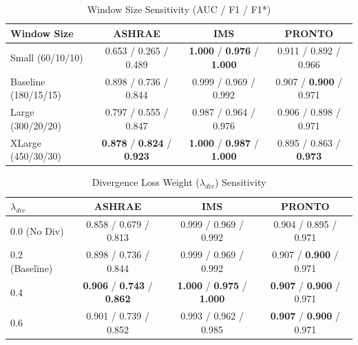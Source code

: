 
\begin{table}[t]
\centering
\scriptsize
\caption{Window Size Sensitivity (AUC / F1 / F1*)}
\label{tab:window_sensitivity}
\begin{tabular}{l|ccc}
\toprule
\textbf{Window Size} & \textbf{ASHRAE} & \textbf{IMS} & \textbf{PRONTO} \\
\midrule
Small (60/10/10) & 0.653 / 0.265 / 0.489 & \textbf{1.000} / \textbf{0.976} / \textbf{1.000} & 0.911 / 0.892 / 0.966 \\
Baseline (180/15/15) & 0.898 / 0.736 / 0.844 & 0.999 / 0.969 / 0.992 & 0.907 / \textbf{0.900} / 0.971 \\
Large (300/20/20) & 0.797 / 0.555 / 0.847 & 0.987 / 0.964 / 0.976 & 0.906 / 0.898 / 0.971 \\
XLarge (450/30/30) & \textbf{0.878} / \textbf{0.824} / \textbf{0.923} & \textbf{1.000} / \textbf{0.987} / \textbf{1.000} & 0.895 / 0.863 / \textbf{0.973} \\
\bottomrule
\end{tabular}
\end{table}

\begin{table}[t]
\centering
\scriptsize
\caption{Divergence Loss Weight ($\lambda_{div}$) Sensitivity}
\label{tab:lambda_sensitivity}
\begin{tabular}{l|ccc}
\toprule
\textbf{$\lambda_{div}$} & \textbf{ASHRAE} & \textbf{IMS} & \textbf{PRONTO} \\
\midrule
0.0 (No Div) & 0.858 / 0.679 / 0.813 & 0.999 / 0.969 / 0.992 & 0.904 / 0.895 / 0.971 \\
0.2 (Baseline) & 0.898 / 0.736 / 0.844 & 0.999 / 0.969 / 0.992 & 0.907 / \textbf{0.900} / 0.971 \\
0.4 & \textbf{0.906} / \textbf{0.743} / \textbf{0.862} & \textbf{1.000} / \textbf{0.975} / \textbf{1.000} & \textbf{0.907} / \textbf{0.900} / 0.971 \\
0.6 & 0.901 / 0.739 / 0.852 & 0.993 / 0.962 / 0.985 & \textbf{0.907} / \textbf{0.900} / 0.971 \\
\bottomrule
\end{tabular}
\end{table}

